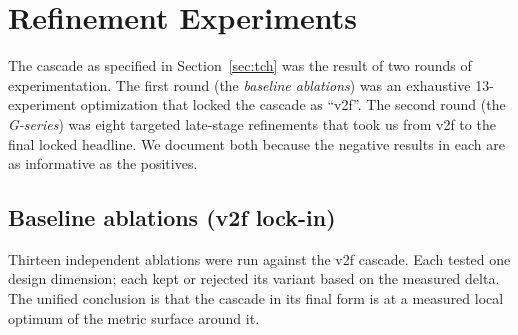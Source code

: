 \section{Refinement Experiments}
\label{sec:g-series}

The cascade as specified in Section~\ref{sec:tch} was the result of two rounds of experimentation. The first round (the \emph{baseline ablations}) was an exhaustive 13-experiment optimization that locked the cascade as ``v2f''. The second round (the \emph{G-series}) was eight targeted late-stage refinements that took us from v2f to the final locked headline. We document both because the negative results in each are as informative as the positives.

\subsection{Baseline ablations (v2f lock-in)}
\label{sec:g-series-ablations}

Thirteen independent ablations were run against the v2f cascade. Each tested one design dimension; each kept or rejected its variant based on the measured delta. The unified conclusion is that the cascade in its final form is at a measured local optimum of the metric surface around it.

